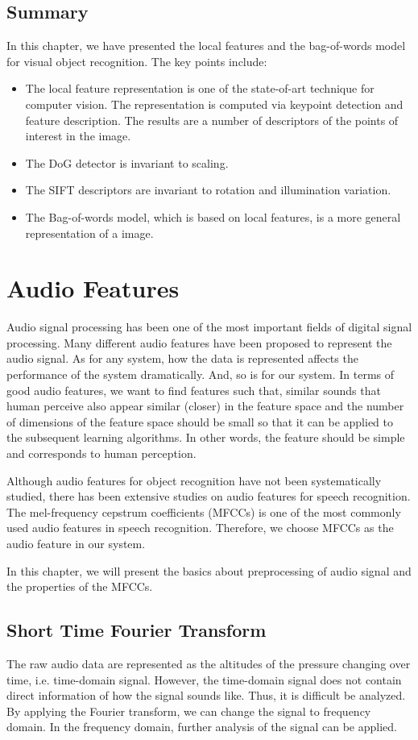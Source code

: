 \documentclass[12pt,final,twoside]{report}
\begin{document}
\section{Summary}
In this chapter, we have presented the local features and the bag-of-words model for visual object recognition. The key points include:
\begin{itemize}
  \item The local feature representation is one of the state-of-art technique for computer vision. The representation is computed via keypoint detection and feature description. The results are a number of descriptors of the points of interest in the image. 
  \item The DoG detector is invariant to scaling.
  \item The SIFT descriptors are invariant to rotation and illumination variation.
  \item The Bag-of-words model, which is based on local features, is a more general representation of a image. 
\end{itemize}

\cleardoublepage
\chapter{Audio Features}
\label{ch:audio}
Audio signal processing has been one of the most important fields of digital signal processing. Many different audio features have been proposed to represent the audio signal. As for any system, how the data is represented affects the performance of the system dramatically. And, so is for our system. In terms of good audio features, we want to find features such that, similar sounds that human perceive also appear similar (closer) in the feature space and the number of dimensions of the feature space should be small so that it can be applied to the subsequent learning algorithms. In other words, the feature should be simple and corresponds to human perception.

Although audio features for object recognition have not been systematically studied, there has been extensive studies on audio features for speech recognition. The mel-frequency cepstrum coefficients (MFCCs) is one of the most commonly used audio features in speech recognition. Therefore, we choose MFCCs as the audio feature in our system.

In this chapter, we will present the basics about preprocessing of audio signal and the properties of the MFCCs.

\section{Short Time Fourier Transform}
The raw audio data are represented as the altitudes of the pressure changing over time, i.e. time-domain signal. However, the time-domain signal does not contain direct information of how the signal sounds like. Thus, it is difficult be analyzed. By applying the Fourier transform, we can change the signal to frequency domain. In the frequency domain, further analysis of the signal can be applied.
\end{document}
